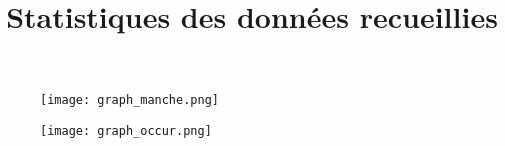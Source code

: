 \documentclass[10pt,a4paper]{article}
\begin{document}
\title{Statistiques des données recueillies}
\author{}
\maketitle
{}  
\thispagestyle{empty}
\begin{landscape}
\vfill
\begin{figure}
    \centering
    \texttt{[image: graph\_manche.png]}
\end{figure}
\vfill
\newpage
\thispagestyle{empty}
\vfill
\begin{figure}
    \centering
    \texttt{[image: graph\_occur.png]}
\end{figure}
\vfill
\end{landscape}
\restoregeometry
\end{document}
